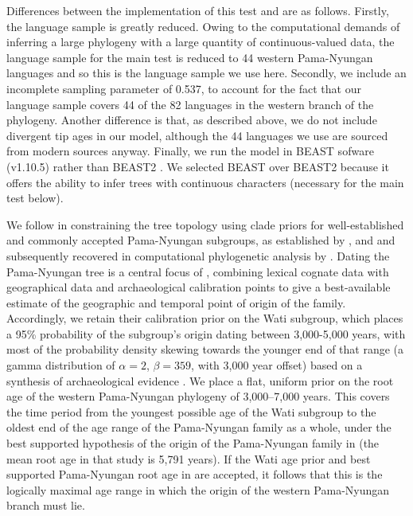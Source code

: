 \documentclass[]{article}
\begin{document}
Differences between the implementation of this test and \textcite{bouckaert_origin_2018} are as follows. Firstly, the language sample is greatly reduced. Owing to the computational demands of inferring a large phylogeny with a large quantity of continuous-valued data, the language sample for the main test is reduced to 44 western Pama-Nyungan languages and so this is the language sample we use here. Secondly, we include an incomplete sampling parameter of 0.537, to account for the fact that our language sample covers 44 of the 82 languages in the western branch of the \textcite{bouckaert_origin_2018} phylogeny. Another difference is that, as described above, we do not include divergent tip ages in our model, although the 44 languages we use are sourced from modern sources anyway. Finally, we run the model in BEAST sofware (v1.10.5) \autocite{suchard_bayesian_2018} rather than BEAST2 \autocite{bouckaert_beast_2019}. We selected BEAST over BEAST2 because it offers the ability to infer trees with continuous characters (necessary for the main test below).

We follow \textcite{bouckaert_origin_2018} in constraining the tree topology using clade priors for well-established and commonly accepted Pama-Nyungan subgroups, as established by \textcite{ogrady_languages_1966}, \textcite{muhlhausler_atlas_1996} and \textcite{koch_languages_2014} and subsequently recovered in computational phylogenetic analysis by \textcite{bowern_computational_2012}. Dating the Pama-Nyungan tree is a central focus of \textcite{bouckaert_origin_2018}, combining lexical cognate data with geographical data and archaeological calibration points to give a best-available estimate of the geographic and temporal point of origin of the family. Accordingly, we retain their calibration prior on the Wati subgroup, which places a 95\% probability of the subgroup's origin dating between 3,000-5,000 years, with most of the probability density skewing towards the younger end of that range (a gamma distribution of \(\alpha = 2\), \(\beta = 359\), with 3,000 year offset) based on a synthesis of archaeological evidence \autocite[see][p.~746]{bouckaert_origin_2018}. We place a flat, uniform prior on the root age of the western Pama-Nyungan phylogeny of 3,000--7,000 years. This covers the time period from the youngest possible age of the Wati subgroup to the oldest end of the age range of the Pama-Nyungan family as a whole, under the best supported hypothesis of the origin of the Pama-Nyungan family in \textcite{bouckaert_origin_2018} (the mean root age in that study is 5,791 years). If the Wati age prior and best supported Pama-Nyungan root age in \textcite{bouckaert_origin_2018} are accepted, it follows that this is the logically maximal age range in which the origin of the western Pama-Nyungan branch must lie.
\end{document}
